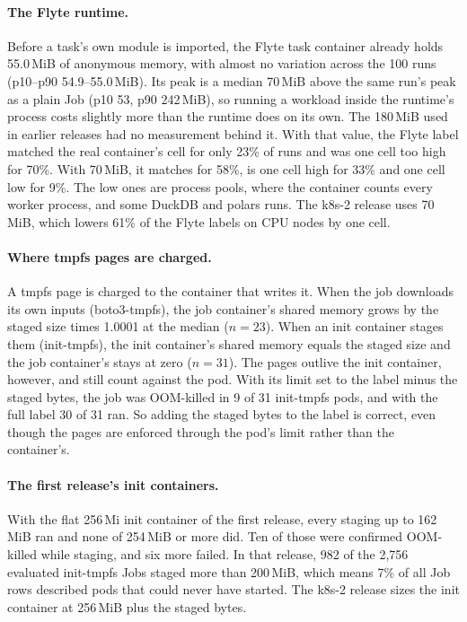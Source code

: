 \paragraph{The Flyte runtime.}
Before a task's own module is imported, the Flyte task container already holds 55.0\,MiB
of anonymous memory, with almost no variation across the 100 runs (p10--p90
54.9--55.0\,MiB). Its peak is a median 70\,MiB above the same run's peak as a plain Job
(p10 53, p90 242\,MiB), so running a workload inside the runtime's process costs slightly
more than the runtime does on its own. The 180\,MiB used in earlier releases had no
measurement behind it. With that value, the Flyte label matched the real container's cell
for only 23\% of runs and was one cell too high for 70\%. With 70\,MiB, it matches for
58\%, is one cell high for 33\% and one cell low for 9\%. The low ones are process pools,
where the container counts every worker process, and some DuckDB and polars runs. The
k8s-2 release uses 70\,MiB, which lowers 61\% of the Flyte labels on CPU nodes by one
cell.

\paragraph{Where tmpfs pages are charged.}
A tmpfs page is charged to the container that writes it. When the job downloads its own
inputs (boto3-tmpfs), the job container's shared memory grows by the staged size times
1.0001 at the median ($n=23$). When an init container stages them (init-tmpfs), the init
container's shared memory equals the staged size and the job container's stays at zero
($n=31$). The pages outlive the init container, however, and still count against the
pod. With its limit set to the label minus the staged bytes, the job was OOM-killed in 9
of 31 init-tmpfs pods, and with the full label 30 of 31 ran. So adding the staged bytes to
the label is correct, even though the pages are enforced through the pod's limit rather
than the container's.

\paragraph{The first release's init containers.}
With the flat 256\,Mi init container of the first release, every staging up to 162\,MiB
ran and none of 254\,MiB or more did. Ten of those were confirmed OOM-killed while staging,
and six more failed. In that release, 982 of the 2,756 evaluated init-tmpfs Jobs staged
more than 200\,MiB, which means 7\% of all Job rows described pods that could never have
started. The k8s-2 release sizes the init container at 256\,MiB plus the staged bytes.

